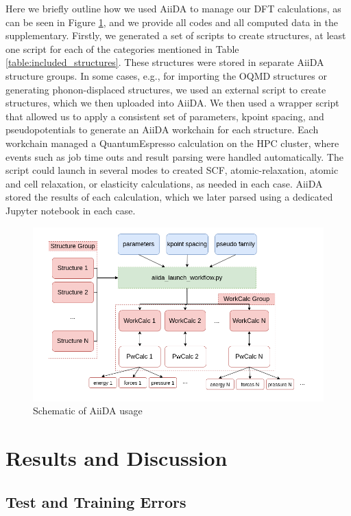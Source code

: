 \documentclass{article}
\begin{document}
Here we briefly outline how we used AiiDA to manage our DFT calculations, as can be seen in Figure \ref{fig:aiida_methods},
and we provide all codes and all computed data in the supplementary.
Firstly, we generated a set of scripts to create structures, at least one script for each of the categories mentioned in Table \ref{table:included_structures}.
These structures were stored in separate AiiDA structure groups.
In some cases, e.g., for importing the OQMD structures or generating phonon-displaced structures, we used an external script to create structures, which we then uploaded into AiiDA.
We then used a wrapper script that allowed us to apply a consistent set of parameters, kpoint spacing, and pseudopotentials to generate an AiiDA workchain for each structure.
Each workchain managed a QuantumEspresso calculation on the HPC cluster, 
where events such as job time outs and result parsing were handled automatically.
The script could launch in several modes to created SCF, atomic-relaxation, atomic and cell relaxation, or elasticity calculations, as needed in each case.
AiiDA stored the results of each calculation, which we later parsed using a dedicated Jupyter\cite{Kluyver2016JupyterWorkflows} notebook in each case. 
\begin{figure}[H]%
\centering%
\includegraphics[width=1.0\textwidth,center]{figures/recalculateDBschematic.png}%
\caption{Schematic of AiiDA usage}%
\label{fig:aiida_methods}
\end{figure}

\section{Results and Discussion}

\subsection{Test and Training Errors}
\end{document}
